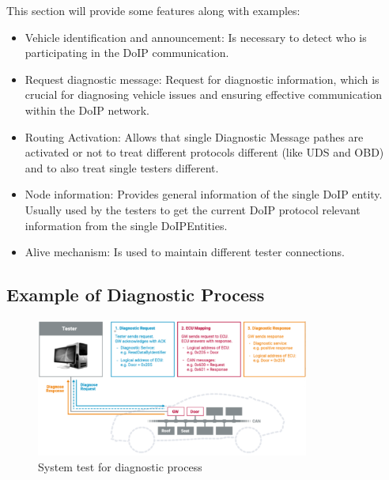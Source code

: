 This section will provide some features along with examples:
\begin{itemize}

    \item Vehicle identification and announcement: Is necessary to detect who is participating in the DoIP communication.

    \item Request diagnostic message: Request for diagnostic information, which is crucial for diagnosing vehicle issues 
    and ensuring effective communication within the DoIP network.

    \item Routing Activation: Allows that single Diagnostic Message pathes are activated or not to treat different protocols 
    different (like UDS and OBD) and to also treat single testers different.
        
    \item Node information: Provides general information of the single DoIP entity. Usually used by the testers to get the
     current DoIP protocol relevant information from the single DoIPEntities.

    \item Alive mechanism: Is used to maintain different tester connections.

\end{itemize}

    \subsection{Example of Diagnostic Process}

    \begin{figure}[htbp]
        \centering
        \includegraphics[width=0.8\textwidth]{./pictures/setup-system-test.png}
        \caption{System test for diagnostic process}
        \label{fig:2.3}
    \end{figure}

